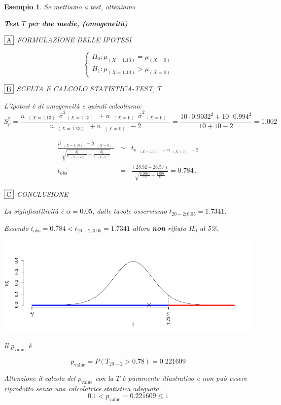 \documentclass[
  11pt,
]{book}
\theoremstyle{mytheoremstyle}
\theoremstyle{mydefstyle}
\newtheorem{example}{{Esempio}}[section]
\begin{document}
\begin{example}
Se mettiamo a test, otteniamo

\textbf{Test \(T\) per due medie, (omogeneità)}

\(\fbox{A}\) FORMULAZIONE DELLE IPOTESI

\[\begin{cases}
   H_0: \mu_\text{$(X=1.13)$} = \mu_\text{$(X=0)$} \\
   H_1: \mu_\text{$(X=1.13)$} > \mu_\text{$(X=0)$} 
   \end{cases}\]

\(\fbox{B}\) SCELTA E CALCOLO STATISTICA-TEST, \(T\)

L'ipotesi è di omogeneità e quindi calcoliamo:\[
   S_p^2=\frac{n_\text{ $(X=1.13)$ }\hat\sigma^2_\text{ $(X=1.13)$ }+n_\text{ $(X=0)$ }\hat\sigma^2_\text{ $(X=0)$ }}{n_\text{ $(X=1.13)$ }+n_\text{ $(X=0)$ }-2} =
   \frac{ 10 \cdot 0.9032 ^2+ 10 \cdot 0.994 ^2}{ 10 + 10 -2}= 1.002 
  \]

\begin{eqnarray*}
  \frac{\hat\mu_\text{ $(X=1.13)$ } - \hat\mu_\text{ $(X=0)$ }}
  {\sqrt{\frac {S^2_p}{n_\text{ $(X=1.13)$ }}+\frac {S^2_p}{n_\text{ $(X=0)$ }}}}&\sim&t_{n_\text{ $(X=1.13)$ }+n_\text{ $(X=0)$ }-2}\\
  t_{\text{obs}}
  &=& \frac{ ( 28.92 -  28.57 )} {\sqrt{\frac{ 0.9064 }{ 10 }+\frac{ 1.098 }{ 10 }}}
  =   0.784 \, .
  \end{eqnarray*}

\(\fbox{C}\) CONCLUSIONE

La siginficatitività è \(\alpha=0.05\), dalle tavole osserviamo \(t_{20-2;0.05}=1.7341\).

Essendo \(t_\text{obs}=0.784<t_{20-2;0.05}=1.7341\) allora \textbf{non} rifiuto \(H_0\) al 5\%.

\begin{center}\includegraphics{Appunti_di_Statistica_2025_files/figure-latex/17-regressione-I-1-1} \end{center}

Il \(p_{\text{value}}\) è

\[ p_{\text{value}} = P(T_{20-2}>0.78)=0.221609 \]

Attenzione il calcolo del \(p_\text{value}\) con la \(T\) è puramente illustrativo e non può essere riprodotto senza una calcolatrice statistica adeguata.\[
 0.1 < p_\text{value}= 0.221609 \leq 1 
\]
\end{example}
\end{document}
